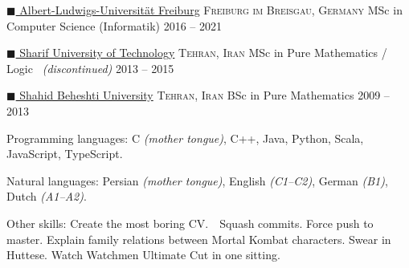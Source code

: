 \documentclass[10pt,a4paper]{article}
\newcommand{\colorsquare}[1]{\textcolor{#1}{$\blacksquare$}}
\begin{document}

\headedsection
  {\href{http://www.uni-freiburg.de/}{\colorsquare{carolinablue} Albert-Ludwigs-Universität Freiburg}}
  {\textsc{Freiburg im Breisgau, Germany}} {%
  \headedsubsection
    {MSc in Computer Science (Informatik)}
    {2016 -- 2021}
    {}
}

\headedsection
  {\href{http://www.en.sharif.edu/}{\colorsquare{amethyst} Sharif University of Technology}}
  {\textsc{Tehran, Iran}} {%
  \headedsubsection
    {MSc in Pure Mathematics / Logic \textnormal{\textit{~(discontinued)}}}
    {2013 -- 2015} 
    {}
}

\headedsection
  {\href{http://en.sbu.ac.ir/}{\colorsquare{brickred} Shahid Beheshti University}}
  {\textsc{Tehran, Iran}} {%
  \headedsubsection
    {BSc in Pure Mathematics}
    {2009 -- 2013} 
    {
    }
}



\spacedhrule{0.5em}{-0.4em}


\inlineheadsection  %
  {Programming languages:}
  {C \emph{(mother tongue)}, C++, Java, Python, Scala, JavaScript, TypeScript.}

\vspace{0.5em}
\inlineheadsection
  {Natural languages:}
  {Persian \emph{(mother tongue)}, English \emph{(C1--C2)}, German \emph{(B1)}, Dutch \emph{(A1--A2)}. 
  }

\vspace{0.5em}
\inlineheadsection
  {Other skills:}
  {Create the most boring CV.~~Squash commits. Force push to master. Explain family relations between Mortal Kombat characters. Swear in Huttese. Watch Watchmen Ultimate Cut in one sitting.}
\end{document}
